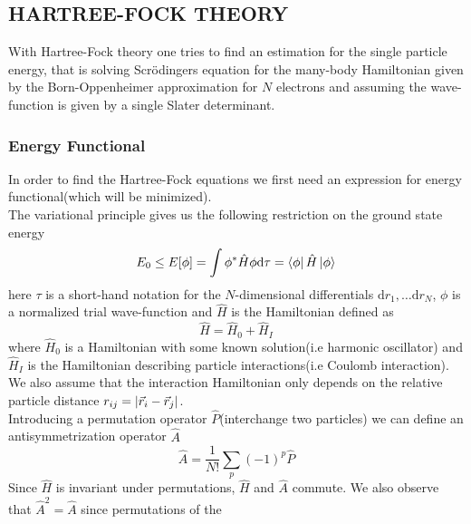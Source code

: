 \documentclass[a4paper, hidelinks, 10pt]{article}
\let\oldsubsection\subsection
\renewcommand{\subsection}[1]{\centering \oldsubsection{{#1}} \justifying}
\newcommand{\md}{\mathrm{d}} %
\begin{document}
\subsection{HARTREE-FOCK THEORY}
\label{sub:hartree_fock}
    With Hartree-Fock theory one tries to find an estimation for the single
    particle energy, that is solving Scrödingers equation for the many-body
    Hamiltonian given by the Born-Oppenheimer approximation for $N$ electrons
    and assuming the wave-function is given by a single Slater determinant. \\

\subsubsection{Energy Functional}
\label{ssub:Energy Functional}
    In order to find the Hartree-Fock equations we first need an expression for
    energy functional(which will be minimized). \\
    The variational principle gives us the following restriction on the ground
    state energy
        \begin{equation}
            E_0 \leq E[\phi] = \int \phi^{*}\hat{H}\phi\md\tau =
            \bra{\phi}\hat{H}\ket{\phi}
            \label{eq:HFvarE}
        \end{equation}
    here $\tau$ is a short-hand notation for the $N$-dimensional differentials
    $\md r_1,\dots\md r_N$, $\phi$ is a normalized trial wave-function and
    $\hat{H}$ is the Hamiltonian defined as
        \begin{equation}
            \hat{H} = \hat{H}_0 + \hat{H}_I
            \label{eq:HFhamiltonian}
        \end{equation}
    where $\hat{H}_0$ is a Hamiltonian with some known solution(i.e harmonic
    oscillator) and $\hat{H}_I$ is the Hamiltonian describing particle
    interactions(i.e Coulomb interaction). We also assume that the interaction
    Hamiltonian only depends on the relative particle distance
    $r_{ij}=\abs{\vec{r}_i-\vec{r}_j}$. \\
    Introducing a permutation operator $\hat{P}$(interchange two particles)
    we can define an antisymmetrization operator $\hat{A}$
        \begin{equation}
            \hat{A} = \frac{1}{N!}\sum_p\left(-1\right)^p\hat{P}
            \label{eq:HFA}
        \end{equation}
    Since $\hat{H}$ is invariant under permutations, $\hat{H}$ and $\hat{A}$
    commute. We also observe that $\hat{A}^2=\hat{A}$ since permutations of the
\end{document}
